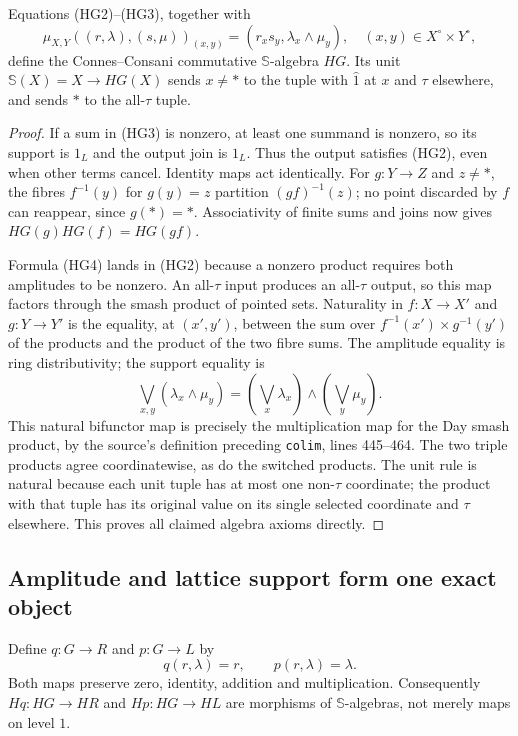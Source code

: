 \begin{theorem}\label{HG:functor}
Equations (HG2)--(HG3), together with
\begin{equation}\tag{HG4}
 \mu_{X,Y}((r,\lambda),(s,\mu))_{(x,y)}
          =(r_xs_y,\lambda_x\wedge\mu_y),
 \quad (x,y)\in X^\circ\times Y^\circ,
\end{equation}
define the Connes--Consani commutative $\mathbb S$-algebra $HG$.
Its unit $\mathbb S(X)=X\to HG(X)$ sends $x\ne *$ to the
tuple with $\widehat1$ at $x$ and $\tau$ elsewhere, and sends
$*$ to the all-$\tau$ tuple.
\end{theorem}
\begin{proof}
If a sum in (HG3) is nonzero, at least one summand is nonzero,
so its support is $1_L$ and the output join is $1_L$.  Thus the
output satisfies (HG2), even when other terms cancel.  Identity
maps act identically.  For $g:Y\to Z$ and $z\ne *$, the fibres
$f^{-1}(y)$ for $g(y)=z$ partition $(gf)^{-1}(z)$; no point
discarded by $f$ can reappear, since $g(*)=*$.  Associativity
of finite sums and joins now gives $HG(g)HG(f)=HG(gf)$.

Formula (HG4) lands in (HG2) because a nonzero product requires
both amplitudes to be nonzero.  An all-$\tau$ input produces an
all-$\tau$ output, so this map factors through the smash product
of pointed sets.  Naturality in $f:X\to X'$ and $g:Y\to Y'$
is the equality, at $(x',y')$, between the sum over
$f^{-1}(x')\times g^{-1}(y')$ of the products and the product
of the two fibre sums.  The amplitude equality is ring
distributivity; the support equality is
\[
 \bigvee_{x,y}(\lambda_x\wedge\mu_y)
       =\left(\bigvee_x\lambda_x\right)
          \wedge\left(\bigvee_y\mu_y\right).
\]
This natural bifunctor map is precisely the multiplication map
for the Day smash product, by the source's definition preceding
\texttt{colim}, lines 445--464.  The two triple products agree
coordinatewise, as do the switched products.  The unit rule is
natural because each unit tuple has at most one non-$\tau$
coordinate; the product with that tuple has its original value
on its single selected coordinate and $\tau$ elsewhere.  This
proves all claimed algebra axioms directly.
\end{proof}

\subsection{Amplitude and lattice support form one exact object}

Define $q:G\to R$ and $p:G\to L$ by
\begin{equation}\tag{HG5}
 q(r,\lambda)=r,\qquad p(r,\lambda)=\lambda.
\end{equation}
Both maps preserve zero, identity, addition and multiplication.
Consequently $Hq:HG\to HR$ and $Hp:HG\to HL$ are morphisms
of $\mathbb S$-algebras, not merely maps on level $1$.

